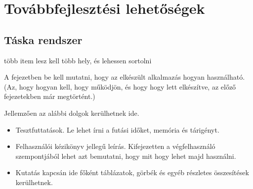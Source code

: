 \chapter{Továbbfejlesztési lehetőségek}




\section{Táska rendszer}
több item lesz kell több hely, és lehessen sortolni








A fejezetben be kell mutatni, hogy az elkészült alkalmazás hogyan használható.
(Az, hogy hogyan kell, hogy működjön, és hogy hogy lett elkészítve, az előző fejezetekben már megtörtént.)

Jellemzően az alábbi dolgok kerülhetnek ide.
\begin{itemize}
\item Tesztfuttatások. Le lehet írni a futási időket, memória és tárigényt.
\item Felhasználói kézikönyv jellegű leírás. Kifejezetten a végfelhasználó szempontjából lehet azt bemutatni, hogy mit hogy lehet majd használni.
\item Kutatás kapcsán ide főként táblázatok, görbék és egyéb részletes összesítések kerülhetnek.
\end{itemize}
